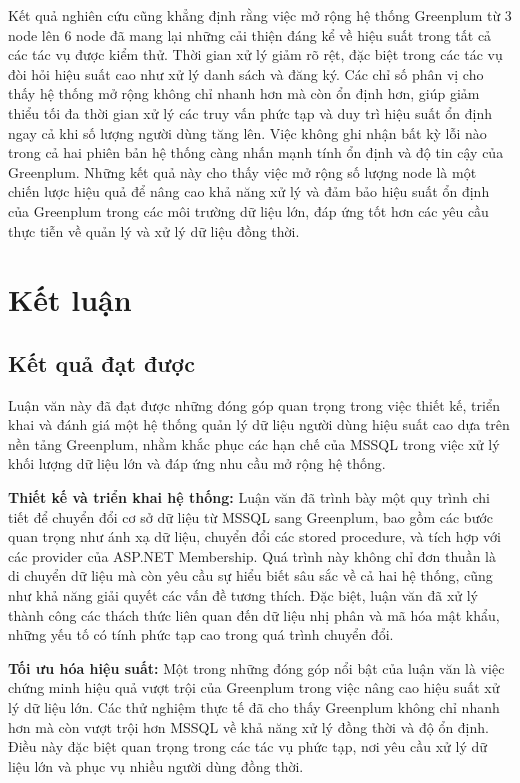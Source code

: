 \documentclass{article}[14pt]
\begin{document}
Kết quả nghiên cứu cũng khẳng định rằng việc mở rộng hệ thống Greenplum từ 3 node lên 6 node đã mang lại những cải thiện đáng kể về hiệu suất trong tất cả các tác vụ được kiểm thử. Thời gian xử lý giảm rõ rệt, đặc biệt trong các tác vụ đòi hỏi hiệu suất cao như xử lý danh sách và đăng ký. Các chỉ số phân vị cho thấy hệ thống mở rộng không chỉ nhanh hơn mà còn ổn định hơn, giúp giảm thiểu tối đa thời gian xử lý các truy vấn phức tạp và duy trì hiệu suất ổn định ngay cả khi số lượng người dùng tăng lên. Việc không ghi nhận bất kỳ lỗi nào trong cả hai phiên bản hệ thống càng nhấn mạnh tính ổn định và độ tin cậy của Greenplum. Những kết quả này cho thấy việc mở rộng số lượng node là một chiến lược hiệu quả để nâng cao khả năng xử lý và đảm bảo hiệu suất ổn định của Greenplum trong các môi trường dữ liệu lớn, đáp ứng tốt hơn các yêu cầu thực tiễn về quản lý và xử lý dữ liệu đồng thời.








\section{Kết luận}

\subsection{Kết quả đạt được}
Luận văn này đã đạt được những đóng góp quan trọng trong việc thiết kế, triển khai và đánh giá một hệ thống quản lý dữ liệu người dùng hiệu suất cao dựa trên nền tảng Greenplum, nhằm khắc phục các hạn chế của MSSQL trong việc xử lý khối lượng dữ liệu lớn và đáp ứng nhu cầu mở rộng hệ thống.

\textbf{Thiết kế và triển khai hệ thống:} Luận văn đã trình bày một quy trình chi tiết để chuyển đổi cơ sở dữ liệu từ MSSQL sang Greenplum, bao gồm các bước quan trọng như ánh xạ dữ liệu, chuyển đổi các stored procedure, và tích hợp với các provider của ASP.NET Membership. Quá trình này không chỉ đơn thuần là di chuyển dữ liệu mà còn yêu cầu sự hiểu biết sâu sắc về cả hai hệ thống, cũng như khả năng giải quyết các vấn đề tương thích. Đặc biệt, luận văn đã xử lý thành công các thách thức liên quan đến dữ liệu nhị phân và mã hóa mật khẩu, những yếu tố có tính phức tạp cao trong quá trình chuyển đổi.

\textbf{Tối ưu hóa hiệu suất:} Một trong những đóng góp nổi bật của luận văn là việc chứng minh hiệu quả vượt trội của Greenplum trong việc nâng cao hiệu suất xử lý dữ liệu lớn. Các thử nghiệm thực tế đã cho thấy Greenplum không chỉ nhanh hơn mà còn vượt trội hơn MSSQL về khả năng xử lý đồng thời và độ ổn định. Điều này đặc biệt quan trọng trong các tác vụ phức tạp, nơi yêu cầu xử lý dữ liệu lớn và phục vụ nhiều người dùng đồng thời.
\end{document}

